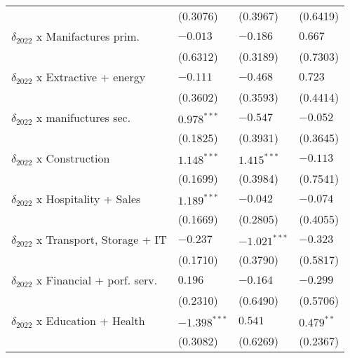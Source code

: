 \begin{tabular}{llll}
                                                   &           (0.3076) &           (0.3967) &           (0.6419) \\
$\delta_{2022}$ x Manifactures prim.               &           $-0.013$ &           $-0.186$ &            $0.667$ \\
                                                   &           (0.6312) &           (0.3189) &           (0.7303) \\
$\delta_{2022}$ x Extractive + energy              &           $-0.111$ &           $-0.468$ &            $0.723$ \\
                                                   &           (0.3602) &           (0.3593) &           (0.4414) \\
$\delta_{2022}$ x manifuctures sec.                &      $0.978^{***}$ &           $-0.547$ &           $-0.052$ \\
                                                   &           (0.1825) &           (0.3931) &           (0.3645) \\
$\delta_{2022}$ x Construction                     &      $1.148^{***}$ &      $1.415^{***}$ &           $-0.113$ \\
                                                   &           (0.1699) &           (0.3984) &           (0.7541) \\
$\delta_{2022}$ x Hospitality + Sales              &      $1.189^{***}$ &           $-0.042$ &           $-0.074$ \\
                                                   &           (0.1669) &           (0.2805) &           (0.4055) \\
$\delta_{2022}$ x Transport, Storage + IT          &           $-0.237$ &     $-1.021^{***}$ &           $-0.323$ \\
                                                   &           (0.1710) &           (0.3790) &           (0.5817) \\
$\delta_{2022}$ x Financial + porf. serv.          &            $0.196$ &           $-0.164$ &           $-0.299$ \\
                                                   &           (0.2310) &           (0.6490) &           (0.5706) \\
$\delta_{2022}$ x Education + Health               &     $-1.398^{***}$ &            $0.541$ &       $0.479^{**}$ \\
                                                   &           (0.3082) &           (0.6269) &           (0.2367) \\

\end{tabular}
